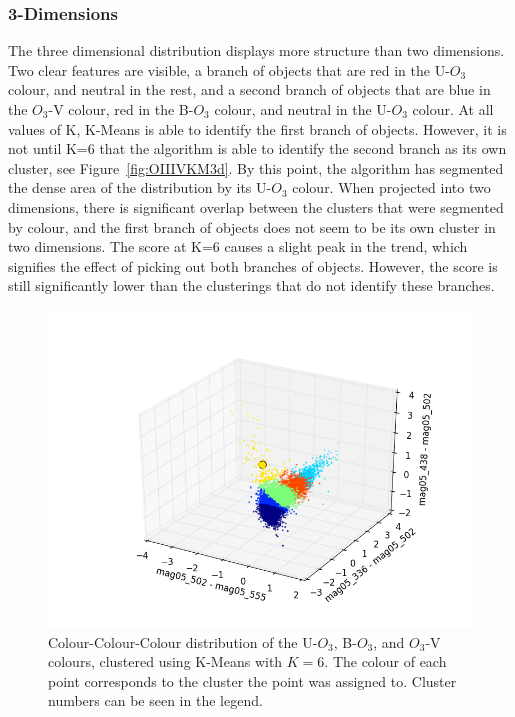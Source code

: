 \subsubsection{3-Dimensions}
The three dimensional distribution displays more structure than two dimensions.
Two clear features are visible, a branch of objects that are red in the U-$O_{3}$ colour, and neutral in the rest, and a second branch of objects that are blue in the $O_{3}$-V colour, red in the B-$O_{3}$ colour, and neutral in the U-$O_{3}$ colour.
At all values of K, K-Means is able to identify the first branch of objects. However, it is not until K=6 that the algorithm is able to identify the second branch as its own cluster, see Figure~\ref{fig:OIIIVKM3d}.
By this point, the algorithm has segmented the dense area of the distribution by its U-$O_{3}$ colour.
When projected into two dimensions, there is significant overlap between the clusters that were segmented by colour, and the first branch of objects does not seem to be its own cluster in two dimensions.
The score at K=6 causes a slight peak in the trend, which signifies the effect of picking out both branches of objects. However, the score is still significantly lower than the clusterings that do not identify these branches.

\begin{figure}
\centering
\includegraphics[width=\linewidth]{figs/kmeans_3d_color_6cl_mag05_502-mag05_555vsmag05_336-mag05_502vsmag05_438-mag05_502}
\caption{Colour-Colour-Colour distribution of the U-$O_{3}$, B-$O_{3}$, and $O_{3}$-V colours, clustered using K-Means with $K=6$. The colour of each point corresponds to the cluster the point was assigned to. Cluster numbers can be seen in the legend.}
\label{fig:fig:OIIIVKM3d}
\end{figure}

